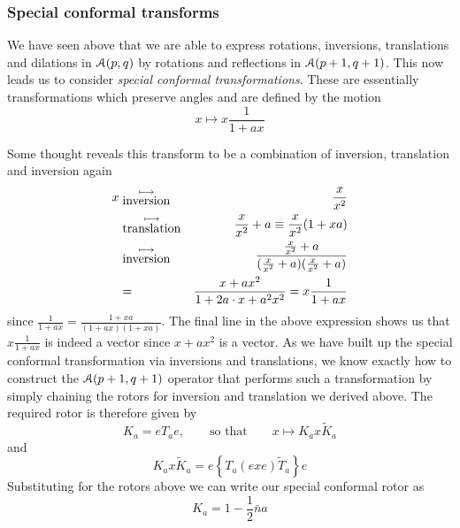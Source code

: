 \subsubsection{Special conformal transforms}


We have seen above that we are able to express rotations,
inversions, translations and dilations in ${\mathcal{A}}(p,q)$
by rotations and reflections in  ${\mathcal{A}}(p+1,q+1)$. This
now leads us to consider \emph{special conformal
transformations}. These are essentially transformations
which preserve angles and are defined by the motion
%
\begin{equation}
x \mapsto  x \frac{1}{1 + ax}
\end{equation}
%

Some thought reveals this transform to be 
a combination of inversion, translation and inversion again
%
\begin{eqnarray}
x   & \stackrel{\longmapsto}{_{\mbox{inversion}}} & \frac{x}{x^2} \nonumber \\
     &  \stackrel{\longmapsto}{_{\mbox{translation}}} & \frac{x}{x^2} + a  \equiv \frac{x}{x^2}(1+xa)  \nonumber \\
     &  \stackrel{\longmapsto}{_{\mbox{inversion}}} & \frac{\frac{x}{x^2} + a}{(\frac{x}{x^2} + a)(\frac{x}{x^2} + a)} \nonumber \\
   & = & \frac{x+ ax^2}{1+2a\cdot x + a^2x^2} = x\frac{1}{1 + ax}
\end{eqnarray}
%
since $\frac{1}{1+ax} = \frac{1+xa}{(1+ax)(1+xa)}$. The
final line in the above expression shows us that
$x\frac{1}{1 + ax}$ is indeed a vector since $x+ ax^2$ is
a vector. As we have built up the special conformal
transformation via inversions and translations, we know
exactly how to construct the ${\mathcal{A}}(p+1,q+1)$ operator
that performs such a transformation by simply chaining the
rotors for inversion and translation we derived above.
The required rotor is therefore given by
%
\begin{equation}
 K_a = eT_a e,\qquad {\mbox{so that}} \qquad x\mapsto K_a x \tilde{K}_a
\end{equation}
%
and
\begin{equation}
   K_a x \tilde{K}_a = e\left\{ T_a(exe)\tilde{T}_a\right\}e
\end{equation}
%
Substituting for the rotors above we can write our special conformal rotor as
%
\begin{equation}
K_a = 1 - \frac{1}{2}\bar{n}a
\end{equation}

